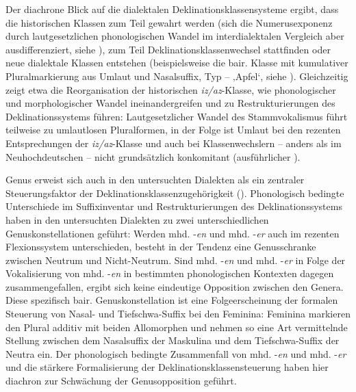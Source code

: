 \begin{sloppypar}
Der diachrone Blick auf die dialektalen Deklinationsklassensysteme ergibt, dass die historischen Klassen zum Teil gewahrt werden (sich die Numerusexponenz durch lautgesetzlichen phonologischen Wandel im interdialektalen Vergleich aber ausdifferenziert, siehe ), zum Teil Deklinationsklassenwechsel stattfinden oder neue dialektale Klassen entstehen (beispielsweise die bair. Klasse mit kumulativer Pluralmarkierung aus Umlaut und Nasalsuffix, Typ  --  ‚Apfel‘, siehe ). Gleichzeitig zeigt etwa die Reorganisation der historischen \textit{iz/az}{}-Klasse, wie phonologischer und morphologischer Wandel ineinandergreifen und zu Restrukturierungen des Deklinationssystems führen: Lautgesetzlicher Wandel des Stammvokalismus führt teilweise zu umlautlosen Pluralformen, in der Folge ist Umlaut bei den rezenten Entsprechungen der \textit{iz/az}{}-Klasse und auch bei Klassenwechslern -- anders als im Neuhochdeutschen -- nicht grundsätzlich konkomitant (ausführlicher ).
\end{sloppypar}

\begin{sloppypar}
Genus erweist sich auch in den untersuchten Dialekten als ein zentraler Steuerungsfaktor der Deklinationsklassenzugehörigkeit (). Phonologisch bedingte Unterschiede im Suffixinventar und Restrukturierungen des Deklinationssystems haben in den untersuchten Dialekten zu zwei unterschiedlichen Genuskonstellationen geführt: Werden mhd. -\textit{en} und mhd. -\textit{er} auch im rezenten Flexionssystem unterschieden, besteht in der Tendenz eine Genusschranke zwischen Neutrum und Nicht-Neutrum. Sind mhd. -\textit{en} und mhd. -\textit{er} in Folge der Vokalisierung von mhd. -\textit{en} in bestimmten phonologischen Kontexten dagegen zusammengefallen, ergibt sich keine eindeutige Opposition zwischen den Genera. Diese spezifisch bair. Genuskonstellation ist eine Folgeerscheinung der formalen Steuerung von Nasal- und Tiefschwa-Suffix bei den Feminina: Feminina markieren den Plural additiv mit beiden Allomorphen und nehmen so eine Art vermittelnde Stellung zwischen dem Nasalsuffix der Maskulina und dem Tiefschwa-Suffix der Neutra ein. Der phonologisch bedingte Zusammenfall von mhd. -\textit{en} und mhd. -\textit{er} und die stärkere Formalisierung der Deklinationsklassensteuerung haben hier diachron zur Schwächung der Genusopposition geführt.
\end{sloppypar}

